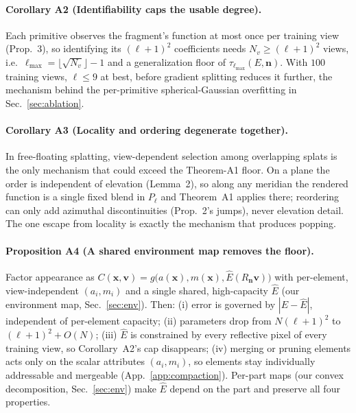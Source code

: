 \paragraph{Corollary A2 (Identifiability caps the usable degree).} Each primitive observes the
fragment's function at most once per training view (Prop.~3), so identifying its $(\ell+1)^2$
coefficients needs $N_v\ge(\ell+1)^2$ views, i.e.\ $\ell_{\max}=\lfloor\sqrt{N_v}\rfloor-1$ and a
generalization floor of $\tau_{\ell_{\max}}(E,\mathbf{n})$. With $100$ training views, $\ell\le9$ at
best, before gradient splitting reduces it further, the mechanism behind the per-primitive
spherical-Gaussian overfitting in Sec.~\ref{sec:ablation}.

\paragraph{Corollary A3 (Locality and ordering degenerate together).} In free-floating splatting,
view-dependent selection among overlapping splats is the only mechanism that could exceed the
Theorem-A1 floor. On a plane the order is independent of elevation (Lemma~2), so along any meridian
the rendered function is a single fixed blend in $P_\ell$ and Theorem~A1 applies there; reordering
can only add azimuthal discontinuities (Prop.~2's jumps), never elevation detail. The one escape
from locality is exactly the mechanism that produces popping. 

\paragraph{Proposition A4 (A shared environment map removes the floor).} Factor appearance as
$C(\mathbf{x},\mathbf{v})=g\big(a(\mathbf{x}),m(\mathbf{x}),\hat E(R_\mathbf{n}\mathbf{v})\big)$
with per-element, view-independent $(a_i,m_i)$ and a single shared, high-capacity $\hat E$ (our
environment map, Sec.~\ref{sec:env}). Then: (i) error is governed by $|E-\hat E|$, independent of
per-element capacity; (ii) parameters drop from $N(\ell+1)^2$ to $(\ell+1)^2+O(N)$; (iii)
$\hat E$ is constrained by every reflective pixel of every training view, so Corollary~A2's cap
disappears; (iv) merging or pruning elements acts only on the scalar attributes $(a_i,m_i)$, so
elements stay individually addressable and mergeable (App.~\ref{app:compaction}). Per-part maps
(our convex decomposition, Sec.~\ref{sec:env}) make $\hat E$ depend on the part and preserve all
four properties.

